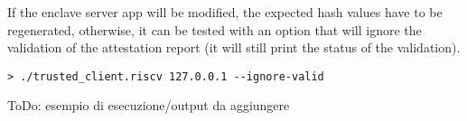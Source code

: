 If the enclave server app will be modified, the expected hash values have to be regenerated, otherwise, it can be tested with an option that will ignore the validation of the attestation report (it will still print the status of the validation). 

\begin{lstlisting}[frame=single]
  > ./trusted_client.riscv 127.0.0.1 --ignore-valid        
\end{lstlisting}
{\color{red} ToDo: esempio di esecuzione/output da aggiungere}
